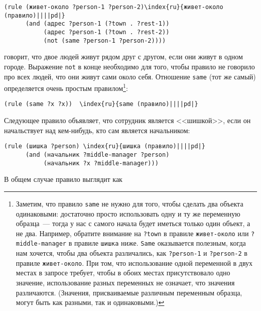 \begin{Verbatim}[fontsize=\small]
(rule (живет-около ?person-1 ?person-2)\index{ru}{живет-около (правило)||||pd|}
      (and (адрес ?person-1 (?town . ?rest-1))
           (адрес ?person-1 (?town . ?rest-2))
           (not (same ?person-1 ?person-2))))
\end{Verbatim}
говорит, что двое людей живут рядом друг с другом, если они живут в
одном городе.  Выражение {\tt not} в конце необходимо для того,
чтобы правило не говорило про всех людей, что они живут сами около
себя.  Отношение {\tt same} (тот же самый) определяется очень
простым правилом\footnote{Заметим, что правило {\tt same} не нужно для
того, чтобы сделать два объекта одинаковыми: достаточно просто
использовать одну и ту же переменную образца~--- тогда у нас с самого
начала будет иметься только один объект, а не два.  Например, обратите
внимание на {\tt ?town} в правиле {\tt живет-около} или
{\tt ?middle-manager} в правиле {\tt шишка}
ниже. {\tt Same} оказывается полезным, когда нам хочется,
чтобы два объекта различались, как {\tt ?person-1} и
{\tt ?person-2} в правиле {\tt живет-около}.  При том,
что использование одной переменной в двух местах в запросе требует,
чтобы в обоих местах присутствовало одно значение, использование
разных переменных не означает, что значения различаются.
(Значения, присваиваемые различным переменным образца, могут быть как
разными, так и одинаковыми.)}:

\begin{Verbatim}[fontsize=\small]
(rule (same ?x ?x))  \index{ru}{same (правило)||||pd|}
\end{Verbatim}

Следующее правило объявляет, что сотрудник является
<<шишкой>>, если он начальствует над кем-нибудь, кто сам является
начальником:

\begin{Verbatim}[fontsize=\small]
(rule (шишка ?person) \index{ru}{шишка (правило)||||pd|}
      (and (начальник ?middle-manager ?person)
           (начальник ?x ?middle-manager)))
\end{Verbatim}

В общем случае правило выглядит как


